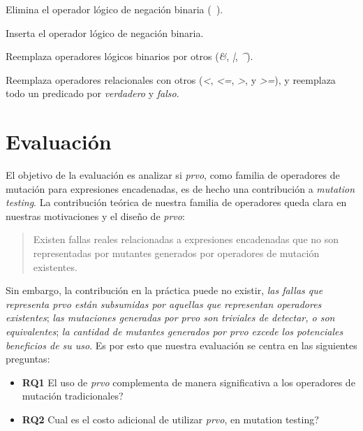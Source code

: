 \begin{description}[leftmargin=8em,style=nextline]
	\item[LOD] Elimina el operador l\'ogico de negaci\'on binaria (\emph{~}).
	\item[LOI] Inserta el operador l\'ogico de negaci\'on binaria.
	\item[LOR] Reemplaza operadores l\'ogicos binarios por otros (\emph{\&}, \emph{|}, \emph{\^}).
	\item[ROR] Reemplaza operadores relacionales con otros (\emph{<}, \emph{<=}, \emph{>}, y \emph{>=}), y reemplaza todo un predicado por \emph{verdadero} y \emph{falso}.
\end{description}

\section{Evaluaci\'on}
\label{sec:evaluation.evaluation}

El objetivo de la evaluaci\'on es analizar si \emph{prvo}, como familia de operadores de mutaci\'on para expresiones encadenadas, es de hecho una contribuci\'on a \emph{mutation testing}. La contribuci\'on te\'orica de nuestra familia de operadores queda clara en nuestras motivaciones y el dise\~no de \emph{prvo}:
\begin{quote}
  Existen fallas reales relacionadas a expresiones encadenadas que no son representadas por mutantes generados por operadores de mutaci\'on existentes.
\end{quote}
Sin embargo, la contribuci\'on en la pr\'actica puede no existir, \emph{las fallas que representa prvo est\'an subsumidas por aquellas que representan operadores existentes}; \emph{las mutaciones generadas por prvo son triviales de detectar, o son equivalentes}; \emph{la cantidad de mutantes generados por prvo excede los potenciales beneficios de su uso}. Es por esto que nuestra evaluaci\'on se centra en las siguientes preguntas:
\begin{itemize}
	\item \textbf{RQ1} El uso de \emph{prvo} complementa de manera significativa a los operadores de mutaci\'on tradicionales?
	
	\item \textbf{RQ2} Cual es el costo adicional de utilizar \emph{prvo}, en mutation testing?
\end{itemize}

